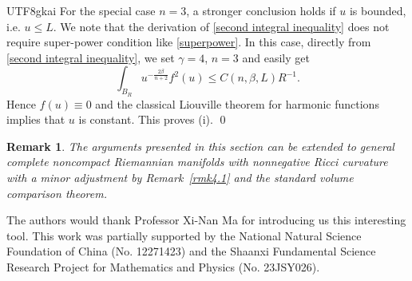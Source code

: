 \documentclass[reqno,12pt]{amsart}
\numberwithin{equation}{section}
\newtheorem{rmk}[thm]{Remark}
\newcommand{\remref}[1]{Remark~\ref{#1}}
\begin{document}
\begin{CJK}{UTF8}{gkai}
   For the special case $n=3$, a stronger conclusion holds if  $u$ is bounded, i.e. $u\le L$. We note that the derivation of \eqref{second integral inequality} does not require super-power condition like \eqref{superpower}. In this case, directly from \eqref{second integral inequality},
   we set $\gamma=4$, $n=3$  and easily get 
   \begin{equation}\label{finalestimate3}
   	   \int_{B_{R}} u^{-\frac{2\beta}{n+2}} f^{2}(u)\le C(n,\beta,L)R^{-1}.
   \end{equation}
   Hence $f(u)\equiv 0$ and the classical Liouville theorem for harmonic functions implies that $u$ is constant.  This proves (i). \qed
   \begin{rmk}
   	   The arguments presented in this section can be extended to general complete noncompact Riemannian manifolds with nonnegative Ricci curvature with a minor adjustment by \remref{rmk4.1} and the standard volume comparison theorem.
   \end{rmk}
   
		The authors would thank  Professor Xi-Nan Ma for introducing us this interesting tool. This work was partially supported by the National Natural Science Foundation of China (No. 12271423) and the Shaanxi Fundamental Science Research Project for Mathematics and Physics (No. 23JSY026).
	
	
	
\end{CJK}
\end{document}
